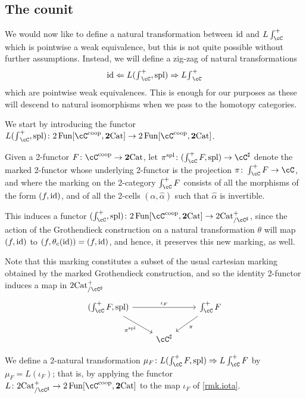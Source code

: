\documentclass[11pt, dvipsnames]{amsart}
\begin{document}
\subsection{The counit}\label{subsec.counit}

We would now like to define a natural transformation between $\mathrm{id}$ and  $L\int_\cC^+ $ which is pointwise a weak equivalence, but this is not quite possible without further assumptions. Instead, we will define a zig-zag of natural transformations \[\id \Leftarrow L({\textstyle \int}_\cC^+ ,\mathrm{spl})\Rightarrow L{\textstyle \int}_\cC^+\]  which are pointwise weak equivalences. This is enough for our purposes as these will descend to natural isomorphisms when we pass to the homotopy categories.

We start by introducing the functor $L({\textstyle \int}_\cC^+ ,\mathrm{spl})\colon 2\Fun[\cC^\coop,\ttwocat]\to 2\Fun[\cC^\coop,\ttwocat]$.

\begin{constr}
    Given a 2-functor $F\colon\cC^\coop\to\ttwocat$, let $\pi^\mathrm{spl}\colon (\int_\cC^+F,\mathrm{spl})\to\Csharp$ denote the marked 2-functor  whose underlying 2-functor is the projection $\pi\colon\int_\cC^+F\to\cC$, and where the marking on the 2-category $\int_\cC^+ F$ consists of all the morphisms of the form $(f,\mathrm{id})$, and of all the 2-cells $(\alpha,\widehat{\alpha})$ such that $\widehat{\alpha}$ is invertible.

   This induces a functor $(\int_\cC^+,\mathrm{spl})\colon 2\Fun[\cC^\coop,\ttwocat]\to \mslicetwocat$, since the action of the Grothendieck construction on a natural transformation $\theta$ will map $(f,\mathrm{id})$ to $(f,\theta_c(\mathrm{id}))=(f,\mathrm{id})$, and hence, it preserves this new marking, as well.  
\end{constr}

\begin{rmk}\label{rmk.iota}
    Note that this marking constitutes a subset of the usual cartesian marking obtained by the marked Grothendieck construction, and so the identity 2-functor induces a map in $\mslicetwocat$
    \[\begin{tikzcd}
        (\int_\cC^+F,\mathrm{spl})\ar[rr,"\iota_F"]\ar[dr,"\pi^\mathrm{spl}"'] && \int_\cC^+ F\ar[ld,"\pi"]\\
        & \Csharp
    \end{tikzcd}\]  
\end{rmk}

\begin{defn}
We define a 2-natural transformation $\mu_F\colon L(\int_\cC^+ F,\mathrm{spl})\Rightarrow L\int_\cC^+ F$ by $\mu_F=L(\iota_F)$; that is, by applying the functor $L\colon \mslicetwocat\to 2\Fun[\cC^\coop,\ttwocat]$ to the map $\iota_F$ of \cref{rmk.iota}.
\end{defn}
\end{document}
